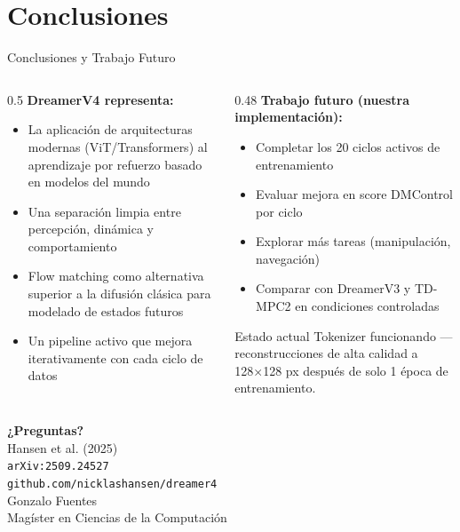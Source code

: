 \documentclass[aspectratio=169, 12pt]{beamer}
\begin{document}
\section{Conclusiones}

\begin{frame}{Conclusiones y Trabajo Futuro}
\begin{columns}[T]
  \begin{column}{0.5\textwidth}
    \textbf{DreamerV4 representa:}
    \begin{itemize}
      \item La aplicación de arquitecturas modernas (ViT/Transformers) al aprendizaje por refuerzo basado en modelos del mundo
      \item Una separación limpia entre percepción, dinámica y comportamiento
      \item Flow matching como alternativa superior a la difusión clásica para modelado de estados futuros
      \item Un pipeline activo que mejora iterativamente con cada ciclo de datos
    \end{itemize}
  \end{column}
  \begin{column}{0.48\textwidth}
    \textbf{Trabajo futuro (nuestra implementación):}
    \begin{itemize}
      \item Completar los 20 ciclos activos de entrenamiento
      \item Evaluar mejora en score DMControl por ciclo
      \item Explorar más tareas (manipulación, navegación)
      \item Comparar con DreamerV3 y TD-MPC2 en condiciones controladas
    \end{itemize}

    \vspace{8pt}
    \begin{alertblock}{Estado actual}
      Tokenizer funcionando — reconstrucciones de alta calidad a 128×128 px después de solo 1 época de entrenamiento.
    \end{alertblock}
  \end{column}
\end{columns}
\end{frame}

\begin{frame}[plain]
  \centering
  \vspace{2cm}
  {\Huge \textbf{¿Preguntas?}}\\[1.5cm]
  {\large Hansen et al. (2025)}\\[0.3cm]
  {\normalsize \texttt{arXiv:2509.24527}}\\[0.3cm]
  {\normalsize \texttt{github.com/nicklashansen/dreamer4}}\\[1.5cm]
  {\large Gonzalo Fuentes\\Magíster en Ciencias de la Computación}
\end{frame}
\end{document}
